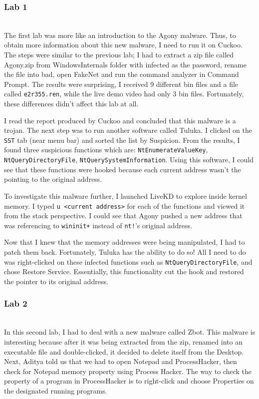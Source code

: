 \documentclass[letterpaper,10pt,titlepage,draftclsnofoot,onecolumn]{IEEEtran}
\begin{document}
\subsubsection{Lab 1}
\hfill\\

The first lab was more like an introduction to the Agony malware. 
Thus, to obtain more information about this new malware, I need to run it on Cuckoo. 
The steps were similar to the previous lab; I had to extract a zip file called Agony.zip from WindowsInternals folder with infected as the password, rename the file into bad, open FakeNet and run the command analyzer in Command Prompt.
The results were surprising, I received 9 different bin files and a file called \verb|e2r355.ren|, while the live demo video had only 3 bin files.
Fortunately, these differences didn't affect this lab at all. 

I read the report produced by Cuckoo and concluded that this malware is a trojan.
The next step was to run another software called Tuluka.
I clicked on the \verb|SST| tab (near menu bar) and sorted the list by Suspicion.
From the results, I found three suspicious functions which are: \verb|NtEnumerateValueKey|,
\verb|NtQueryDirectoryFile|, \verb|NtQuerySystemInformation|.
Using this software, I could see that these functions were hooked because each current address wasn't the pointing to the original address.

To investigate this malware further, I launched LiveKD to explore inside kernel memory.
I typed \verb|u <current address>| for each of the functions and viewed it from the stack perspective. 
I could see that Agony pushed a new address that was referencing to \verb|wininit+| instead of \verb|nt!|'s original address.

Now that I knew that the memory addresses were being manipulated, I had to patch them back.
Fortunately, Tuluka has the ability to do so! 
All I need to do was right-clicked on these infected functions such as \verb|NtQueryDirectoryFile|, and chose Restore Service. 
Essentially, this functionality cut the hook and restored the pointer to its original address. 
\hfill\\
\subsubsection{Lab 2}
\hfill\\

In this second lab, I had to deal with a new malware called Zbot. 
This malware is interesting because after it was being extracted from the zip, renamed into an executable file and double-clicked, it decided to delete itself from the Desktop.
Next, Aditya told us that we had to open Notepad and ProcessHacker, then check for Notepad memory property using Process Hacker.
The way to check the property of a program in ProcessHacker is to right-click and choose Properties on the designated running programs.
\end{document}
